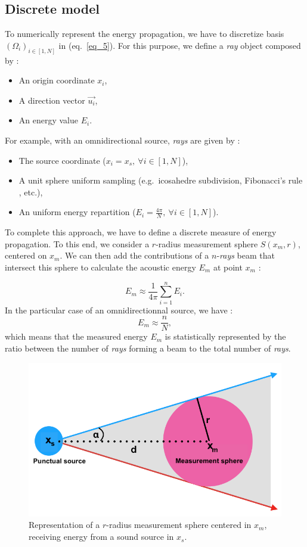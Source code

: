 \documentclass[AMA,STIX1COL]{WileyNJD-v2}
\begin{document}
\subsection{Discrete model}

To numerically represent the energy propagation, we have to discretize basis $(\Omega_i)_{i\in[1,N] }$ in (eq.~\ref{eq_5}). For this purpose, we define a \textit{ray} object composed by :
\begin{itemize}
\item An origin coordinate $x_i$,
\item A direction vector $\overrightarrow{u_i}$,
\item An energy value $E_i$.
\end{itemize}

For example, with an omnidirectional source, \textit{rays} are given by :
\begin{itemize}
\item The source coordinate ($x_i = x_s,~\forall i\in[1,N]$),
\item A unit sphere uniform sampling (e.g.~icosahedre subdivision, Fibonacci's rule \cite{fibonacci}, etc.),
\item An uniform energy repartition ($E_i = \frac{4\pi}{N},~\forall i\in[1,N]$).
\end{itemize}

To complete this approach, we have to define a discrete measure of energy propagation. To this end, we consider a $r$-radius measurement sphere $S(x_m, r)$, centered on $x_m$.  We can then add the contributions of a $n$-\textit{rays}  beam that intersect this sphere to calculate the acoustic energy $E_m$ at point $x_m$ :

\begin{equation}
E_m \approx  \frac{1}{4\pi}  \sum_{i=1}^n E_i.
\end{equation}
In the particular case of an omnidirectionnal source, we have : 
\begin{equation}
E_m \approx  \frac{n}{N},
\end{equation}
which means that the measured energy $E_m$ is statistically represented by the ratio between the number of \textit{rays} forming a beam to the total number of \textit{rays}.

\begin{figure}[t]
\centering
	\includegraphics[width=0.6\linewidth]{schema_rayon}
	\caption{Representation of a $r$-radius measurement sphere centered in $x_m$, receiving energy from a sound source in $x_s$.}
	\label{schema_rayon}
\end{figure}
\end{document}
